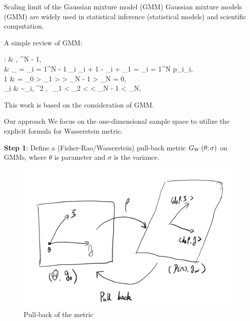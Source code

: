 \documentclass{beamer}
\begin{document}
\begin{frame}{Scaling limit of the Gaussian mixture model (GMM)}
	Gaussian mixture models (GMM) are widely used in statistical inference 
	(statistical models) and scientific computation.
	\par
	A simple review of GMM:
	\bequn
	\begin{aligned}
	\rho: \Theta & \rightarrow \mcP\lp \mbR \rp, \quad \Theta \subset \mbR^{N - 1},			\\
	\theta & \mapsto \rho_{\theta} = \sum_{i = 1}^{N - 1} \theta_i \lp \rho_{i + 1} - \rho_i \rp + \rho_1 = \sum_{i = 1}^{N} p_i\rho_i, \\
	1  & = \theta_0 > \theta_1 > \cdots > \theta_{N - 1} > \theta_N = 0,			\\
	\rho_i & \sim \mcN\lp \mu_i, \sigma^2 \rp, \ \mu_1 < \mu_2 < \cdots < \mu_{N - 1} < \mu_N,
	\end{aligned}
	\eequn
	This work is based on the consideration of GMM.
\end{frame}


\begin{frame}{Our approach}
	We focus on the one-dimensional sample space to utilize the explicit formula for Wasserstein metric.
	\par
	\textbf{Step 1}: Define a (Fisher-Rao/Wasserstein) pull-back metric $G_W\left( \theta; \sigma \right)$ on GMMs, where $\theta$ is parameter and $\sigma$ is the variance.
	\begin{figure}[H]
          \centering
          \centerline{\includegraphics[width=0.7\linewidth]{pull_back.png}}
          \caption{Pull-back of the metric}
    	\end{figure}
\end{frame}
\end{document}
